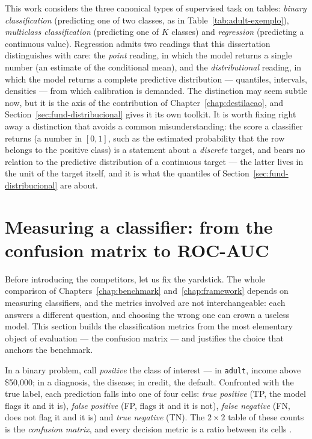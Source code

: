 This work considers the three canonical types of supervised task on
tables: \emph{binary classification} (predicting one of two classes,
as in Table~\ref{tab:adult-exemplo}), \emph{multiclass
classification} (predicting one of $K$ classes) and \emph{regression}
(predicting a continuous value). Regression admits two readings that
this dissertation distinguishes with care: the \emph{point} reading,
in which the model returns a single number (an estimate of the
conditional mean), and the \emph{distributional} reading, in which
the model returns a complete predictive distribution --- quantiles,
intervals, densities --- from which calibration is demanded. The
distinction may seem subtle now, but it is the axis of the
contribution of Chapter~\ref{chap:destilacao}, and
Section~\ref{sec:fund-distribucional} gives it its own toolkit. It is
worth fixing right away a distinction that avoids a common
misunderstanding: the score a classifier returns (a number in
$[0,1]$, such as the estimated probability that the row belongs to
the positive class) is a statement about a \emph{discrete} target,
and bears no relation to the predictive distribution of a continuous
target --- the latter lives in the unit of the target itself, and it
is what the quantiles of Section~\ref{sec:fund-distribucional} are
about.

\section{Measuring a classifier: from the confusion matrix to ROC-AUC}
\label{sec:fund-metricas-clf}

Before introducing the competitors, let us fix the yardstick. The
whole comparison of Chapters~\ref{chap:benchmark}
and~\ref{chap:framework} depends on measuring classifiers, and the
metrics involved are not interchangeable: each answers a different
question, and choosing the wrong one can crown a useless model. This
section builds the classification metrics from the most elementary
object of evaluation --- the confusion matrix --- and justifies the
choice that anchors the benchmark.

In a binary problem, call \emph{positive} the class of interest ---
in \texttt{adult}, income above \$50{,}000; in a diagnosis,
the disease; in credit, the default. Confronted with the true label,
each prediction falls into one of four cells: \emph{true positive}
(TP, the model flags it and it is), \emph{false positive} (FP, flags
it and it is not), \emph{false negative} (FN, does not flag it and it
is) and \emph{true negative} (TN). The $2\times 2$ table of these
counts is the \emph{confusion matrix}, and every decision metric is a
ratio between its cells \citep{hastie2009,fawcett2006}.


